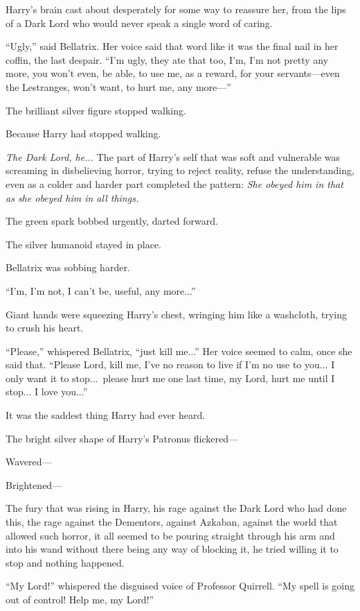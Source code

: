 Harry’s brain cast about desperately for some way to reassure her, from the lips of a Dark Lord who would never speak a single word of caring.

“Ugly,” said Bellatrix. Her voice said that word like it was the final nail in her coffin, the last despair. “I’m ugly, they ate that too, I’m, I’m not pretty any more, you won’t even, be able, to use me, as a reward, for your servants—even the Lestranges, won’t want, to hurt me, any more—”

The brilliant silver figure stopped walking.

Because Harry had stopped walking.

\emph{The Dark Lord, he...} The part of Harry’s self that was soft and vulnerable was screaming in disbelieving horror, trying to reject reality, refuse the understanding, even as a colder and harder part completed the pattern: \emph{She obeyed him in that as she obeyed him in all things.}

The green spark bobbed urgently, darted forward.

The silver humanoid stayed in place.

Bellatrix was sobbing harder.

“I’m, I’m not, I can’t be, useful, any more...”

Giant hands were squeezing Harry’s chest, wringing him like a washcloth, trying to crush his heart.

“Please,” whispered Bellatrix, “just kill me...” Her voice seemed to calm, once she said that. “Please Lord, kill me, I’ve no reason to live if I’m no use to you... I only want it to stop...\ please hurt me one last time, my Lord, hurt me until I stop... I love you...”

It was the saddest thing Harry had ever heard.

The bright silver shape of Harry’s Patronus flickered—

Wavered—

Brightened—

The fury that was rising in Harry, his rage against the Dark Lord who had done this, the rage against the Dementors, against Azkaban, against the world that allowed such horror, it all seemed to be pouring straight through his arm and into his wand without there being any way of blocking it, he tried willing it to stop and nothing happened.

“My Lord!” whispered the disguised voice of Professor Quirrell. “My spell is going out of control! Help me, my Lord!”

